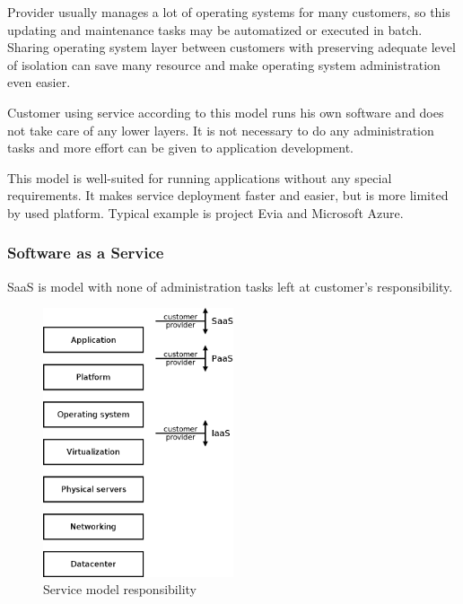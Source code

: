 Provider usually manages a lot of operating systems for many customers, so  this updating and maintenance tasks may be automatized or executed in batch. Sharing operating system layer between customers with preserving adequate level of isolation can save many resource and make operating system administration even easier.

Customer using service according to this model runs his own software and does not take care of any lower layers. It is not necessary to do any administration tasks and more effort can be given to application development. 

This model is well-suited for running applications without any special requirements. It makes service deployment faster and easier, but is more limited by used platform. 
Typical example is project Evia and Microsoft Azure.

\subsubsection{Software as a Service}
\Ac{SaaS} is model with none of administration tasks left at customer's responsibility.

\begin{figure}[htb]
	\begin{center}
	\includegraphics[width=0.5\textwidth]{service-models.png}
	\end{center}
	\caption{Service model responsibility}
	\label{img:service-models}
\end{figure}

